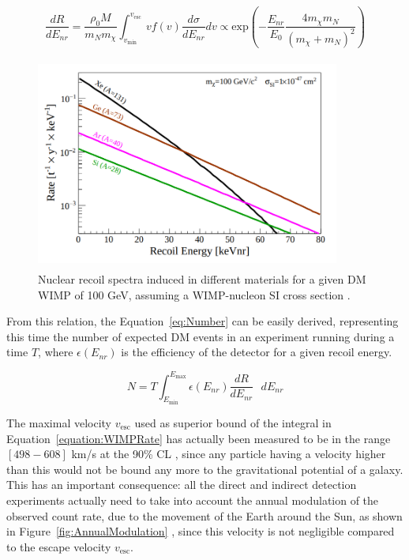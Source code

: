 \documentclass[a4paper, 10pt, openright]{report}
\begin{document}
\begin{equation}
\label{equation:WIMPRate}
\frac{dR}{dE_{nr}} = \frac{\rho_0 M}{m_N m_\chi} \int_{v_{\text{min}}}^{v_{\text{esc}}} v f(v) \frac{d \sigma}{dE_{nr}}dv \propto \text{exp} \left (- \frac{E_{nr}}{E_0} \frac{4 m_\chi m_N}{(m_\chi + m_N)^2} \right )
\end{equation}

\begin{figure}[htbp]
\begin{center}
\includegraphics[width=10cm, height=7cm]{figs/DirectFalling.png}
\caption{ Nuclear recoil spectra induced in different materials for a given \ac{DM} \ac{WIMP} of 100 GeV, assuming a WIMP-nucleon \ac{SI} cross section \cite{DirectSearches}.}
\label{fig:DirectFalling}
\end{center}
\end{figure}

From this relation, the Equation~\ref{eq:Number} can be easily derived, representing this time the number of expected \ac{DM} events in an experiment running during a time $T$, where $\epsilon(E_{nr})$ is the efficiency of the detector for a given recoil energy.

\begin{equation}
\label{eq:Number}
N = T \int_{E_{\text{min}}}^{E_{\text{max}}} \epsilon(E_{nr}) \frac{dR}{dE_{nr}} \text{ } dE_{nr}
\end{equation}

The maximal velocity $v_{\text{esc}}$ used as superior bound of the integral in Equation~\ref{equation:WIMPRate} has actually been measured to be in the range $[498-608]$ km/s at the 90\% \ac{CL} \cite{EscapeVelocity}, since any particle having a velocity higher than this would not be bound any more to the gravitational potential of a galaxy. This has an important consequence: all the direct and indirect detection experiments actually need to take into account the annual modulation of the observed count rate, due to the movement of the Earth around the Sun, as shown in Figure~\ref{fig:AnnualModulation} \cite{AnnualModulation}, since this velocity is not negligible compared to the escape velocity $v_{\text{esc}}$. 
\end{document}
